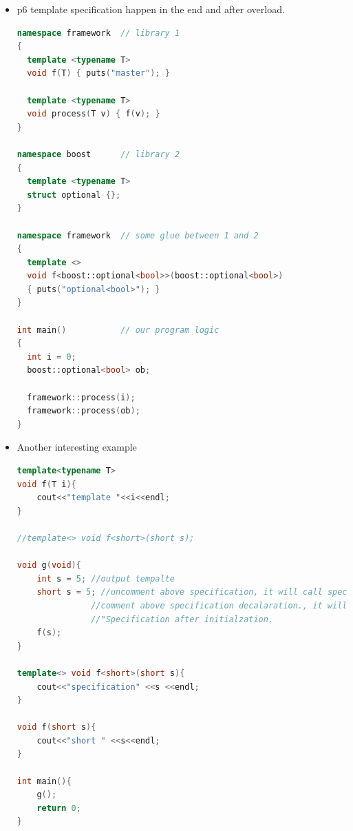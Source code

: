 \documentclass[a4paper,12pt,twoside]{book}
\begin{document}
\begin{itemize}
\begin{lstlisting}[frame=single, language=c++]
namespace boost      // some glue between 1 and 2
{     
  template <typename T>
  void f(optional<T>) { puts("optional<T>"); }
    
  inline
  void f(optional<bool>) { puts("optional<bool>"); }
}
 
int main()           // our program logic
{
  int i = 0;
  boost::optional<int>  oi;
  boost::optional<bool> ob;
  
  framework::process(i);
  framework::process(oi);
  framework::process(ob);
}
\end{lstlisting}

\item p6 template specification happen in the end and after overload. 
\begin{lstlisting}[frame=single, language=c++]
namespace framework  // library 1
{
  template <typename T>
  void f(T) { puts("master"); }
 
  template <typename T>
  void process(T v) { f(v); } 
}
 
namespace boost      // library 2
{
  template <typename T>
  struct optional {};
}
 
namespace framework  // some glue between 1 and 2
{     
  template <>
  void f<boost::optional<bool>>(boost::optional<bool>)
  { puts("optional<bool>"); }
}
 
int main()           // our program logic
{
  int i = 0;
  boost::optional<bool> ob;
  
  framework::process(i);
  framework::process(ob);
}
\end{lstlisting}

\item Another interesting example
\begin{lstlisting}[frame=single, language=c++]
template<typename T>
void f(T i){
	cout<<"template "<<i<<endl;
}

//template<> void f<short>(short s);

void g(void){
	int s = 5; //output tempalte
	short s = 5; //uncomment above specification, it will call specification version.
	           //comment above specification decalaration., it will report error
	           //"Specification after initialzation.
	f(s);
}

template<> void f<short>(short s){
	cout<<"specification" <<s <<endl;
}

void f(short s){
	cout<<"short " <<s<<endl;
}

int main(){
	g();
	return 0;
}
\end{lstlisting}
\end{itemize}
\end{document}
